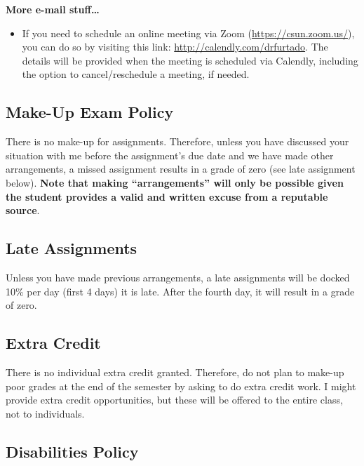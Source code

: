 \documentclass[11pt,]{article}
\providecommand{\tightlist}{%
  \setlength{\itemsep}{0pt}\setlength{\parskip}{0pt}}
\begin{document}
\textbf{More e-mail stuff\ldots{}}

\begin{itemize}
\tightlist
\item
  If you need to schedule an online meeting via Zoom
  (\url{https://csun.zoom.us/}), you can do so by visiting this link:
  \url{http://calendly.com/drfurtado}. The details will be provided when
  the meeting is scheduled via Calendly, including the option to
  cancel/reschedule a meeting, if needed.
\end{itemize}

\hypertarget{make-up-exam-policy}{%
\subsection{Make-Up Exam Policy}\label{make-up-exam-policy}}

There is no make-up for assignments. Therefore, unless you have
discussed your situation with me before the assignment's due date and we
have made other arrangements, a missed assignment results in a grade of
zero (see late assignment below). \textbf{Note that making
``arrangements'' will only be possible given the student provides a
valid and written excuse from a reputable source}.

\hypertarget{late-assignments}{%
\subsection{Late Assignments}\label{late-assignments}}

Unless you have made previous arrangements, a late assignments will be
docked 10\% per day (first 4 days) it is late. After the fourth day, it
will result in a grade of zero.

\hypertarget{extra-credit}{%
\subsection{Extra Credit}\label{extra-credit}}

There is no individual extra credit granted. Therefore, do not plan to
make-up poor grades at the end of the semester by asking to do extra
credit work. I might provide extra credit opportunities, but these will
be offered to the entire class, not to individuals.

\hypertarget{disabilities-policy}{%
\subsection{Disabilities Policy}\label{disabilities-policy}}
\end{document}
